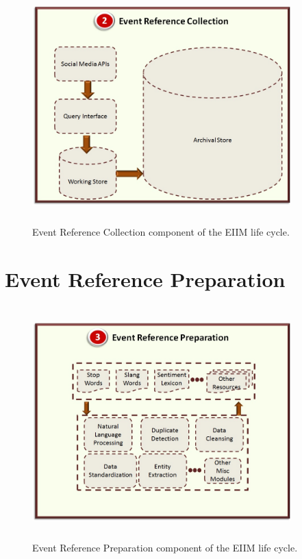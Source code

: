 \begin{figure}[htbp]
  \caption{Event Reference Collection component of the EIIM life cycle.}
  \centering
    \includegraphics[width=10cm,height=9cm]{Figures/EIIMComponents/EventReferenceCollection.jpg}
\end{figure}

\section{Event Reference Preparation}

\begin{figure}[htbp]
  \caption{Event Reference Preparation component of the EIIM life cycle.}
  \centering
    \includegraphics[width=10cm,height=9cm]{Figures/EIIMComponents/EventReferencePreparation.jpg}
\end{figure}

